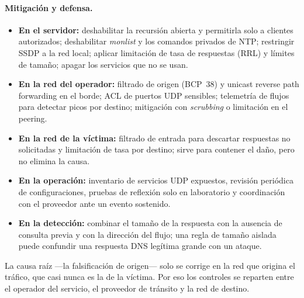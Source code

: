 \paragraph{Mitigación y defensa.}
\begin{itemize}
	\item \textbf{En el servidor:} deshabilitar la recursión abierta y permitirla solo a clientes autorizados; deshabilitar \textit{monlist} y los comandos privados de NTP; restringir SSDP a la red local; aplicar limitación de tasa de respuestas (RRL) y límites de tamaño; apagar los servicios que no se usan.
	\item \textbf{En la red del operador:} filtrado de origen (BCP~38) y unicast reverse path forwarding en el borde; ACL de puertos UDP sensibles; telemetría de flujos para detectar picos por destino; mitigación con \textit{scrubbing} o limitación en el peering.
	\item \textbf{En la red de la víctima:} filtrado de entrada para descartar respuestas no solicitadas y limitación de tasa por destino; sirve para contener el daño, pero no elimina la causa.
	\item \textbf{En la operación:} inventario de servicios UDP expuestos, revisión periódica de configuraciones, pruebas de reflexión solo en laboratorio y coordinación con el proveedor ante un evento sostenido.
	\item \textbf{En la detección:} combinar el tamaño de la respuesta con la ausencia de consulta previa y con la dirección del flujo; una regla de tamaño aislada puede confundir una respuesta DNS legítima grande con un ataque.
\end{itemize}
La causa raíz —la falsificación de origen— solo se corrige en la red que origina el tráfico, que casi nunca es la de la víctima. Por eso los controles se reparten entre el operador del servicio, el proveedor de tránsito y la red de destino.

